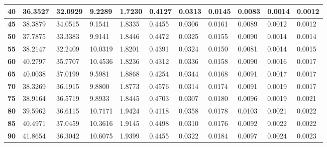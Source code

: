 \begin{table}[ht]
\begin{tabular}{|l|l|l|l|l|l|l|l|l|l|l|}
\textbf{40}      & 36.3527           & 32.0929           & 9.2289            & 1.7230            & 0.4127           & 0.0313           & 0.0145          & 0.0083          & 0.0014          & 0.0012         \\ \hline
\textbf{45}      & 38.3879           & 34.0515           & 9.1541            & 1.8335            & 0.4455           & 0.0306           & 0.0161          & 0.0089          & 0.0012          & 0.0012         \\ \hline
\textbf{50}      & 37.7875           & 33.3383           & 9.9141            & 1.8446            & 0.4472           & 0.0325           & 0.0155          & 0.0090          & 0.0014          & 0.0014         \\ \hline
\textbf{55}      & 38.2147           & 32.2409           & 10.0319           & 1.8201            & 0.4391           & 0.0324           & 0.0150          & 0.0081          & 0.0014          & 0.0015         \\ \hline
\textbf{60}      & 40.2797           & 35.7707           & 10.4536           & 1.8236            & 0.4312           & 0.0336           & 0.0158          & 0.0090          & 0.0016          & 0.0017         \\ \hline
\textbf{65}      & 40.0038           & 37.0199           & 9.5981            & 1.8868            & 0.4254           & 0.0344           & 0.0168          & 0.0091          & 0.0017          & 0.0017         \\ \hline
\textbf{70}      & 38.3269           & 36.1915           & 9.8800            & 1.8773            & 0.4576           & 0.0314           & 0.0174          & 0.0091          & 0.0019          & 0.0017         \\ \hline
\textbf{75}      & 38.9164           & 36.5719           & 9.8933            & 1.8445            & 0.4703           & 0.0307           & 0.0180          & 0.0096          & 0.0019          & 0.0021         \\ \hline
\textbf{80}      & 39.5962           & 36.6115           & 10.7171           & 1.9424            & 0.4118           & 0.0358           & 0.0178          & 0.0103          & 0.0021          & 0.0022         \\ \hline
\textbf{85}      & 40.4971           & 37.0459           & 10.3616           & 1.9145            & 0.4498           & 0.0310           & 0.0176          & 0.0092          & 0.0022          & 0.0022         \\ \hline
\textbf{90}      & 41.8654           & 36.3042           & 10.6075           & 1.9399            & 0.4455           & 0.0322           & 0.0184          & 0.0097          & 0.0024          & 0.0023         \\ \hline

\end{tabular}
\end{table}
